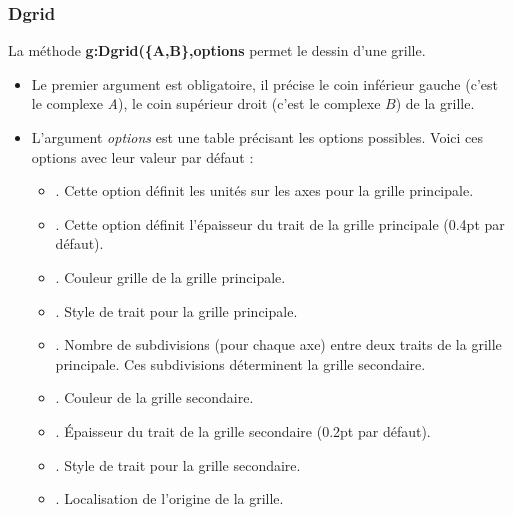 \documentclass[%
10pt,%
a4paper,%
french,%
]%
{article}%
\begin{document}
\subsubsection{Dgrid}

La méthode \textbf{g:Dgrid(\{A,B\},options} permet le dessin d'une grille.
\begin{itemize}
    \item Le premier argument est obligatoire, il précise le coin inférieur gauche (c'est le complexe \emph{A}), le coin supérieur droit (c'est le complexe $B$) de la grille.
    \item L'argument \emph{options} est une table précisant les options possibles. Voici ces options avec leur valeur par défaut :
        \begin{itemize}
            \item {}. Cette option définit les unités sur les axes pour la grille principale.
            \item {}. Cette option définit l'épaisseur du trait de la grille principale (0.4pt par défaut).
            \item {}. Couleur grille de la grille principale.
            \item {}. Style de trait pour la grille principale.
            \item {}. Nombre de subdivisions (pour chaque axe) entre deux traits de la grille principale. Ces subdivisions déterminent la grille secondaire.
            \item {}. Couleur de la grille secondaire.
            \item {}. Épaisseur du trait de la grille secondaire (0.2pt par défaut).
            \item {}. Style de trait pour la grille secondaire.
            \item {}. Localisation de l'origine de la grille.
        \end{itemize}
\end{itemize}
\end{document}
